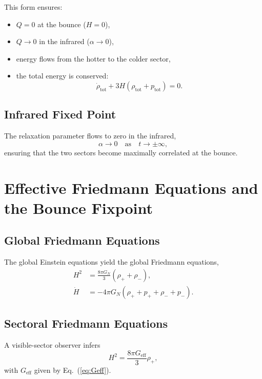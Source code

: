 \documentclass[11pt,a4paper]{article}
\begin{document}
This form ensures:

\begin{itemize}
\item $Q = 0$ at the bounce ($H = 0$),
\item $Q \to 0$ in the infrared ($\alpha \to 0$),
\item energy flows from the hotter to the colder sector,
\item the total energy is conserved:
\begin{equation}
\dot{\rho}_{\mathrm{tot}} + 3H(\rho_{\mathrm{tot}} + p_{\mathrm{tot}}) = 0.
\end{equation}
\end{itemize}

\subsection{Infrared Fixed Point}

The relaxation parameter flows to zero in the infrared,
\begin{equation}
\alpha \to 0 \quad \text{as} \quad t \to \pm \infty,
\end{equation}
ensuring that the two sectors become maximally correlated at the bounce.

\section{Effective Friedmann Equations and the Bounce Fixpoint}

\subsection{Global Friedmann Equations}

The global Einstein equations yield the global Friedmann equations,
\begin{align}
H^2 &= \frac{8\pi G_N}{3} (\rho_+ + \rho_-), \\
\dot{H} &= -4\pi G_N (\rho_+ + p_+ + \rho_- + p_-).
\end{align}

\subsection{Sectoral Friedmann Equations}

A visible-sector observer infers
\begin{equation}
H^2 = \frac{8\pi G_{\mathrm{eff}}}{3} \rho_+,
\end{equation}
with $G_{\mathrm{eff}}$ given by Eq.~(\ref{eq:Geff}).
\end{document}
